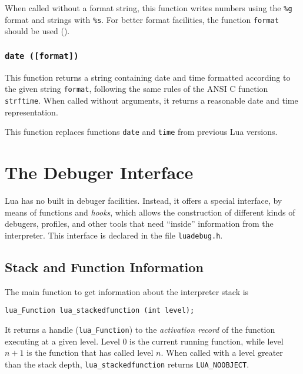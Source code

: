 When called without a format string,
this function writes numbers using the \verb'%g' format
and strings with \verb'%s'.
For better format facilities,
the function \verb'format' should be used ().

\subsubsection*{{\tt date ([format])}}

This function returns a string containing date and time
formatted according to the given string \verb'format',
following the same rules of the ANSI C function \verb'strftime'.
When called without arguments,
it returns a reasonable date and time representation.

This function replaces functions \verb'date' and \verb'time' from
previous Lua versions.





\section{The Debuger Interface} \label{debugI}

Lua has no built in debuger facilities.
Instead, it offers a special interface,
by means of functions and {\em hooks},
which allows the construction of different
kinds of debugers, profiles, and other tools
that need ``inside'' information from the interpreter.
This interface is declared in the file \verb'luadebug.h'.

\subsection{Stack and Function Information}

The main function to get information about the interpreter stack
is
\begin{verbatim}
lua_Function lua_stackedfunction (int level);
\end{verbatim}
It returns a handle (\verb'lua_Function') to the {\em activation record\/}
of the function executing at a given level.
Level 0 is the current running function,
while level $n+1$ is the function that has called level $n$.
When called with a level greater than the stack depth,
\verb'lua_stackedfunction' returns \verb'LUA_NOOBJECT'.

